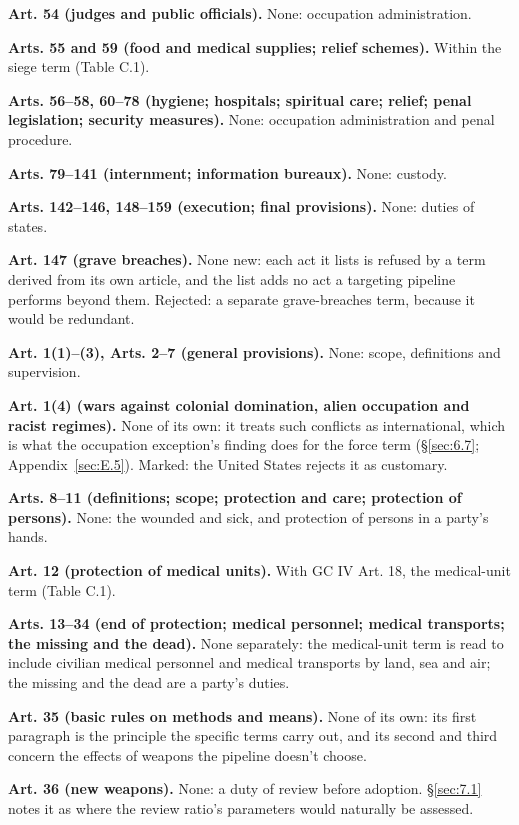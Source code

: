 \textbf{Art. 54 (judges and public officials).} None: occupation administration.

\textbf{Arts. 55 and 59 (food and medical supplies; relief schemes).} Within the siege term (Table C.1).

\textbf{Arts. 56–58, 60–78 (hygiene; hospitals; spiritual care; relief; penal legislation; security measures).} None: occupation administration and penal procedure.

\textbf{Arts. 79–141 (internment; information bureaux).} None: custody.

\textbf{Arts. 142–146, 148–159 (execution; final provisions).} None: duties of states.

\textbf{Art. 147 (grave breaches).} None new: each act it lists is refused by a term derived from its own article, and the list adds no act a targeting pipeline performs beyond them. Rejected: a separate grave-breaches term, because it would be redundant.


\textbf{Art. 1(1)–(3), Arts. 2–7 (general provisions).} None: scope, definitions and supervision.

\textbf{Art. 1(4) (wars against colonial domination, alien occupation and racist regimes).} None of its own: it treats such conflicts as international, which is what the occupation exception's finding does for the force term (\S\ref{sec:6.7}; Appendix~\ref{sec:E.5}). Marked: the United States rejects it as customary.

\textbf{Arts. 8–11 (definitions; scope; protection and care; protection of persons).} None: the wounded and sick, and protection of persons in a party's hands.

\textbf{Art. 12 (protection of medical units).} With GC IV Art. 18, the medical-unit term (Table C.1).

\textbf{Arts. 13–34 (end of protection; medical personnel; medical transports; the missing and the dead).} None separately: the medical-unit term is read to include civilian medical personnel and medical transports by land, sea and air; the missing and the dead are a party's duties.

\textbf{Art. 35 (basic rules on methods and means).} None of its own: its first paragraph is the principle the specific terms carry out, and its second and third concern the effects of weapons the pipeline doesn't choose.

\textbf{Art. 36 (new weapons).} None: a duty of review before adoption. \S\ref{sec:7.1} notes it as where the review ratio's parameters would naturally be assessed.

